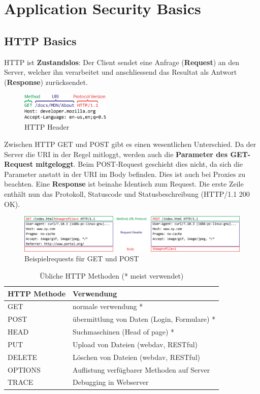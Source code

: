 \section{Application Security Basics}

\subsection{HTTP Basics}

HTTP ist \textbf{Zustandslos}: Der Client sendet eine Anfrage (\textbf{Request}) an den Server, welcher ihn verarbeitet und anschliessend das Resultat als Antwort (\textbf{Response}) zurücksendet.\\

\begin{figure}[H]
	\centering
	\includegraphics[width=0.38\textwidth]{./img/http-head}
	\caption{HTTP Header}
\end{figure}

Zwischen HTTP GET und POST gibt es einen wesentlichen Unterschied. Da der Server die URI in der Regel mitloggt, werden auch die \textbf{Parameter des GET-Request mitgeloggt}. Beim POST-Request geschieht dies nicht, da sich die Parameter anstatt in der URI im Body befinden. Dies ist auch bei Proxies zu beachten. Eine \textbf{Response} ist beinahe Identisch zum Request. Die erste Zeile enthält nun das Protokoll, Statuscode und Statusbeschreibung (HTTP/1.1 200 OK).

\begin{figure}[H]
	\centering
	\includegraphics[width=\textwidth]{./img/http-full-request}
	\caption{Beispielrequests für GET und POST}
\end{figure}

\begin{table}[H]
	\begin{tabularx}{\textwidth}{l|X}
		\textbf{HTTP Methode} & \textbf{Verwendung}\\ \hline
		GET		& normale verwendung *\\ \hline
		POST	& übermittlung von Daten (Login, Formulare) *\\ \hline
		HEAD	& Suchmaschinen (Head of page) *\\ \hline
		PUT		& Upload von Dateien (webdav, RESTful)\\ \hline
		DELETE	& Löschen von Dateien (webdav, RESTful)\\ \hline
		OPTIONS	& Auflistung verfügbarer Methoden auf Server\\ \hline
		TRACE	& Debugging in Webserver\\ \hline
	\end{tabularx}
	\caption{Übliche HTTP Methoden (* meist verwendet)}
\end{table}


